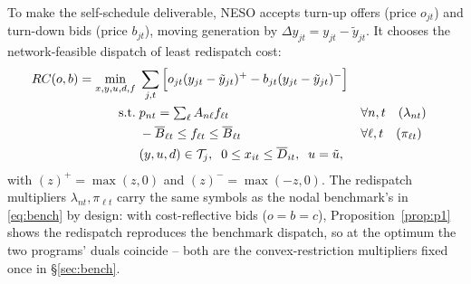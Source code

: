 \documentclass[review,3p,times]{elsarticle}
\theoremstyle{plain}
\theoremstyle{definition}
\begin{document}
To make the self-schedule deliverable, NESO accepts turn-up offers (price
$o_{jt}$) and turn-down bids (price $b_{jt}$), moving generation by
$\Delta y_{jt}=y_{jt}-\tilde y_{jt}$. It chooses the network-feasible dispatch of least
redispatch cost:
\begin{align}
RC(o,b)=\min_{x,y,u,d,f}\;& \sum_{j,t}\Big[o_{jt}(y_{jt}-\tilde y_{jt})^{+}
   - b_{jt}(y_{jt}-\tilde y_{jt})^{-}\Big]
\label{eq:rc}\\
\text{s.t.}\;& p_{nt}=\textstyle\sum_{\ell} A_{n\ell}f_{\ell t}
   && \forall n,t\quad(\lambda_{nt})\notag\\
& -\overline B_{\ell t}\le f_{\ell t}\le \overline B_{\ell t}
   && \forall \ell,t\quad(\pi_{\ell t})\notag\\
& (y,u,d)\in\mathcal T_j,\;\; 0\le x_{it}\le\overline D_{it},\;\; u=\tilde u,
   && \notag
\end{align}
 with $(z)^{+}=\max(z,0)$ and $(z)^{-}=\max(-z,0)$. The redispatch multipliers
$\lambda_{nt},\pi_{\ell t}$ carry the same symbols as the nodal benchmark's in
\eqref{eq:bench} by design: with cost-reflective bids ($o=b=c$),
Proposition~\ref{prop:p1} shows the redispatch reproduces the benchmark dispatch,
so at the optimum the two programs' duals coincide -- both are the
convex-restriction multipliers fixed once in \S\ref{sec:bench}.
\end{document}
